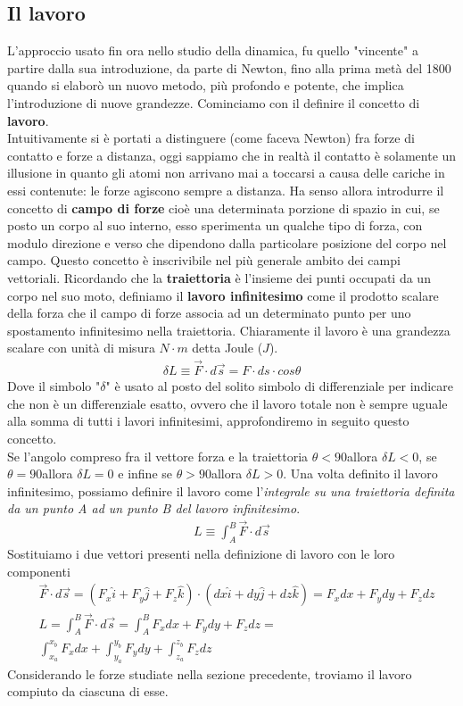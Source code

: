 \subsection{Il lavoro}
L'approccio usato fin ora nello studio della dinamica, fu quello "vincente" a partire dalla sua introduzione, da parte di Newton, fino alla prima metà del 1800 quando si elaborò un nuovo metodo, più profondo e potente, che implica l'introduzione di nuove grandezze. Cominciamo con il definire il concetto di \textbf{lavoro}.\\
Intuitivamente si è portati a distinguere (come faceva Newton) fra forze di contatto e forze a distanza, oggi sappiamo che in realtà il contatto è solamente un illusione in quanto gli atomi non arrivano mai a toccarsi a causa delle cariche in essi contenute: le forze agiscono sempre a distanza. Ha senso allora introdurre il concetto di \textbf{campo di forze} cioè una determinata porzione di spazio in cui, se posto un corpo al suo interno, esso sperimenta un qualche tipo di forza, con modulo direzione e verso che dipendono dalla particolare posizione del corpo nel campo. Questo concetto è inscrivibile nel più generale ambito dei campi vettoriali. Ricordando che la \textbf{traiettoria} è l'insieme dei punti occupati da un corpo nel suo moto, definiamo il \textbf{lavoro infinitesimo} come il prodotto scalare della forza che il campo di forze associa ad un determinato punto per uno spostamento infinitesimo nella traiettoria. Chiaramente il lavoro è una grandezza scalare con unità di misura $N \cdot m$ detta Joule ($J$).
\begin{align*}
	\delta L \equiv \vec{F} \cdot d\vec{s} = F \cdot ds\cdot cos\theta
\end{align*}
Dove il simbolo "$\delta$" è usato al posto del solito simbolo di differenziale per indicare che non è un differenziale esatto, ovvero che il lavoro totale non è sempre uguale alla somma di tutti i lavori infinitesimi, approfondiremo in seguito questo concetto.\\
Se l'angolo compreso fra il vettore forza e la traiettoria $\theta < 90$\textdegree allora $\delta L < 0$, se $\theta = 90$\textdegree allora $\delta L = 0$ e infine se $\theta > 90$\textdegree allora $\delta L > 0$. Una volta definito il lavoro infinitesimo, possiamo definire il lavoro come l'\textit{integrale su una traiettoria definita da un punto A ad un punto B del lavoro infinitesimo}.
\begin{align*}
L \equiv \int_{A}^{B} \vec{F} \cdot d\vec{s}
\end{align*}
Sostituiamo i due vettori presenti nella definizione di lavoro con le loro componenti
\begin{align*}
&\vec{F} \cdot d\vec{s} = (F_x \hat{i}+F_y \hat{j}+F_z \hat{k})\cdot (dx \hat{i}+dy \hat{j}+dz \hat{k}) = F_x dx+F_y dy+F_z dz\\
&L = \int_{A}^{B} \vec{F} \cdot d\vec{s} = \int_{A}^{B} F_x dx+F_y dy+F_z dz =\\
&\int_{x_a}^{x_b} F_x dx+\int_{y_a}^{y_b} F_y dy+\int_{z_a}^{z_b} F_z dz
\end{align*}
Considerando le forze studiate nella sezione precedente, troviamo il lavoro compiuto da ciascuna di esse.
